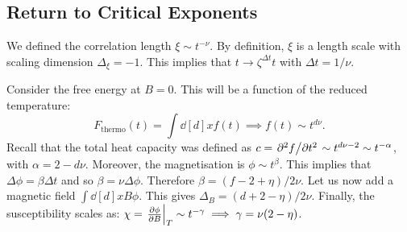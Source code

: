 \subsection{Return to Critical Exponents}%
\label{sub:return_to_critical_exponents}

We defined the correlation length $\xi \sim t^{-\nu}$. By definition, $\xi$ is a length scale with scaling dimension $\Delta_{\xi} = -1$. This implies that $t \to \zeta^{\Delta t} t$ with $\Delta t = 1/\nu$.

Consider the free energy at $B = 0$. This will be a function of the reduced temperature:
\begin{equation}
  F_{\text{thermo}}(t) = \int \dd[d]{x} f(t) \implies f(t) \sim t^{d\nu}.
\end{equation}
Recall that the total heat capacity was defined as $c = \pdv*[2]{f}{t} \sim t^{d\nu - 2} \sim t^{-\alpha}$, with $\alpha = 2 - d \nu$.
Moreover, the magnetisation is $\phi \sim t^{\beta}$. This implies that $\Delta \phi = \beta \Delta t$ and so $\beta = \nu \Delta \phi$. Therefore $\beta = (f - 2 + \eta) / 2 \nu$.
Let us now add a magnetic field $\int \dd[d]{x} B \phi$. This gives $\Delta_B = (d + 2 - \eta)/2 \nu$. 
Finally, the susceptibility scales as: $\chi = \left.\pdv{\phi}{B}\right\rvert_{T} \sim t^{-\gamma} \implies \gamma = \nu (2 - \eta)$.
